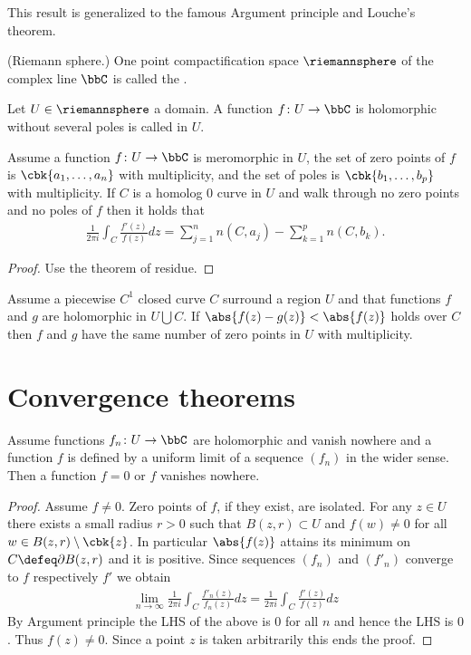 \documentclass[openany, a4paper, oneside]{jsbook}
\begin{document}
This result is generalized to the famous Argument principle and Louche's theorem.
\begin{defn}\textup{(Riemann sphere.)}
 One point compactification space $\riemannsphere$ of the complex line $\bbC$ is called the .
\end{defn}
\begin{defn}
 Let $U \in \riemannsphere$ a domain.
 A function $f \colon U \to \bbC$ is holomorphic without several poles is called  in $U$.
\end{defn}
\begin{thm}
 Assume a function $f \colon U \to \bbC$ is meromorphic in $U$, the set of zero points of $f$ is $\cbk{a_1, \dots, a_n}$ with multiplicity,
 and the set of poles is $\cbk{b_1, \dots, b_p}$ with multiplicity.
 If $C$ is a homolog 0 curve in $U$ and walk through no zero points and no poles of $f$ then it holds that
 \begin{align}
  \frac{1}{2 \pi i} \int_C \frac{f'(z)}{f (z)} dz
  =
  \sum_{j=1}^n n (C, a_j) - \sum_{k=1}^p n (C, b_k).
 \end{align}
\end{thm}
\begin{proof}
 Use the theorem of residue.
\end{proof}
\begin{thm}[Louche]
 Assume a piecewise $C^1$ closed curve $C$ surround a region $U$ and that functions $f$ and $g$ are holomorphic in $U \bigcup C$.
 If $\abs{f (z) - g (z)} < \abs{f (z)}$ holds over $C$ then $f$ and $g$ have the same number of zero points in $U$ with multiplicity.
 \end{thm}
\section{Convergence theorems}

\begin{thm}
 Assume functions $f_n \colon U \to \bbC$ are holomorphic and vanish nowhere
 and a function $f$ is defined by a uniform limit of a sequence $(f_n)$ in the wider sense.
 Then a function $f = 0$ or $f$ vanishes nowhere.
\end{thm}
\begin{proof}
 Assume $f \neq 0$.
 Zero points of $f$, if they exist, are isolated.
 For any $z \in U$ there exists a small radius $r>0$ such that $B (z, r) \subset U$ and $f (w) \neq 0$ for all $w \in B (z, r) \setminus \cbk{z}$.
 In particular $\abs{f (z)}$ attains its minimum on $C \defeq \partial B (z, r)$ and it is positive.
 Since sequences $(f_n)$ and $(f'_n)$ converge to $f$ respectively $f'$ we obtain
 \begin{align}
  \lim_{n \to \infty} \frac{1}{2 \pi i} \int_C \frac{f'_n (z)}{f_n (z)} dz
  =
  \frac{1}{2 \pi i} \int_C \frac{f' (z)}{f (z)} dz
 \end{align}
 By Argument principle the LHS of the above is $0$ for all $n$ and hence the LHS is $0$.
 Thus $f (z) \neq 0$.
 Since a point $z$ is taken arbitrarily this ends the proof.
\end{proof}
\end{document}
